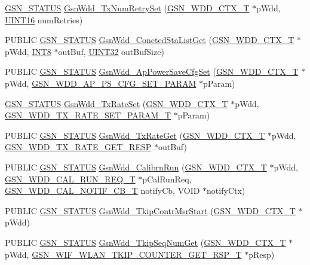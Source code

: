 \begin{DoxyCompactItemize}
\item 
\hyperlink{a00660_gada5951904ac6110b1fa95e51a9ddc217}{GSN\_\-STATUS} \hyperlink{a00603_aa8ca906f4af22c0b80ff7215e1a108c3}{GsnWdd\_\-TxNumRetrySet} (\hyperlink{a00108}{GSN\_\-WDD\_\-CTX\_\-T} $\ast$pWdd, \hyperlink{a00660_ga09f1a1fb2293e33483cc8d44aefb1eb1}{UINT16} numRetries)
\item 
PUBLIC \hyperlink{a00660_gada5951904ac6110b1fa95e51a9ddc217}{GSN\_\-STATUS} \hyperlink{a00603_a85216b4b30c90f4cff6c9d54f2a81724}{GsnWdd\_\-ConctedStaListGet} (\hyperlink{a00108}{GSN\_\-WDD\_\-CTX\_\-T} $\ast$pWdd, \hyperlink{a00660_ga307b8734c020247f6bac4fcde0dcfbb9}{INT8} $\ast$outBuf, \hyperlink{a00660_gae1e6edbbc26d6fbc71a90190d0266018}{UINT32} outBufSize)
\item 
PUBLIC \hyperlink{a00660_gada5951904ac6110b1fa95e51a9ddc217}{GSN\_\-STATUS} \hyperlink{a00603_afe0f0c0deb0c4dabae6b5bd8f10d7d5d}{GsnWdd\_\-ApPowerSaveCfgSet} (\hyperlink{a00108}{GSN\_\-WDD\_\-CTX\_\-T} $\ast$pWdd, \hyperlink{a00368}{GSN\_\-WDD\_\-AP\_\-PS\_\-CFG\_\-SET\_\-PARAM} $\ast$pParam)
\item 
\hyperlink{a00660_gada5951904ac6110b1fa95e51a9ddc217}{GSN\_\-STATUS} \hyperlink{a00603_ac2f00d6c26c21ba93cbfccf3268ce24f}{GsnWdd\_\-TxRateSet} (\hyperlink{a00108}{GSN\_\-WDD\_\-CTX\_\-T} $\ast$pWdd, \hyperlink{a00409}{GSN\_\-WDD\_\-TX\_\-RATE\_\-SET\_\-PARAM\_\-T} $\ast$pParam)
\item 
PUBLIC \hyperlink{a00660_gada5951904ac6110b1fa95e51a9ddc217}{GSN\_\-STATUS} \hyperlink{a00603_a8abf7e27edb280ffd4d2359b0801adc8}{GsnWdd\_\-TxRateGet} (\hyperlink{a00108}{GSN\_\-WDD\_\-CTX\_\-T} $\ast$pWdd, \hyperlink{a00409}{GSN\_\-WDD\_\-TX\_\-RATE\_\-GET\_\-RESP} $\ast$outBuf)
\item 
PUBLIC \hyperlink{a00660_gada5951904ac6110b1fa95e51a9ddc217}{GSN\_\-STATUS} \hyperlink{a00603_a5268fb233d28c9b4b7bd7e758ac8d5b0}{GsnWdd\_\-CalibrnRun} (\hyperlink{a00108}{GSN\_\-WDD\_\-CTX\_\-T} $\ast$pWdd, \hyperlink{a00319}{GSN\_\-WDD\_\-CAL\_\-RUN\_\-REQ\_\-T} $\ast$pCalRunReq, \hyperlink{a00603_a1dbcda6416e95d84f0c8f8f8dcad8a18}{GSN\_\-WDD\_\-CAL\_\-NOTIF\_\-CB\_\-T} notifyCb, VOID $\ast$notifyCtx)
\item 
PUBLIC \hyperlink{a00660_gada5951904ac6110b1fa95e51a9ddc217}{GSN\_\-STATUS} \hyperlink{a00603_a3f7de0ec3e1e6c4f5d70e214299aee5e}{GsnWdd\_\-TkipContrMsrStart} (\hyperlink{a00108}{GSN\_\-WDD\_\-CTX\_\-T} $\ast$pWdd)
\item 
PUBLIC \hyperlink{a00660_gada5951904ac6110b1fa95e51a9ddc217}{GSN\_\-STATUS} \hyperlink{a00603_aaa503be4534404b18f4d674a2829c922}{GsnWdd\_\-TkipSeqNumGet} (\hyperlink{a00108}{GSN\_\-WDD\_\-CTX\_\-T} $\ast$pWdd, \hyperlink{a00407}{GSN\_\-WIF\_\-WLAN\_\-TKIP\_\-COUNTER\_\-GET\_\-RSP\_\-T} $\ast$pResp)

\end{DoxyCompactItemize}
